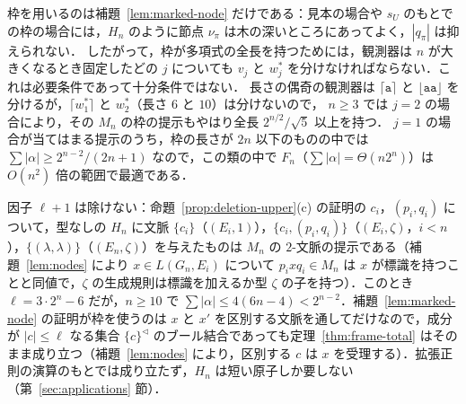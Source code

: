 \documentclass[11pt,a4paper]{ltjsarticle}
\numberwithin{equation}{section}
\theoremstyle{plain}
\theoremstyle{definition}
\theoremstyle{remark}
\theoremstyle{plain}
\newcommand{\eps}{\lambda}
\newcommand{\Lc}{^{\lhd}}
\newcommand{\Lfl}{\lfloor}
\newcommand{\Rfl}{\rfloor}
\newcommand{\Lce}{\lceil}
\newcommand{\Rce}{\rceil}
\newcommand{\ta}{\mathtt a}
\begin{document}
枠を用いるのは補題~\ref{lem:marked-node} だけである：見本の場合や $s_U$ のもとでの枠の場合には，$H_n$ のように節点 $\nu_\pi$ は木の深いところにあってよく，$|q_\pi|$ は抑えられない．
したがって，枠が多項式の全長を持つためには，観測器は $n$ が大きくなるとき固定したどの $j$ についても $v_j$ と $w^*_j$ を分けなければならない．これは必要条件であって十分条件ではない．
長さの偶奇の観測器は $\Lce\ta\Rce$ と $\Lfl\ta\ta\Rfl$ を分けるが，$\Lce w^*_1\Rce$ と $w^*_2$（長さ $6$ と $10$）は分けないので，
$n\ge3$ では $j=2$ の場合により，その $M_n$ の枠の提示もやはり全長 $2^{n/2}/\sqrt5$ 以上を持つ．
$j=1$ の場合が当てはまる提示のうち，枠の長さが $2n$ 以下のものの中では $\sum|\alpha|\ge2^{n-2}/(2n+1)$ なので，この類の中で $F_n$（$\sum|\alpha|=\Theta(n2^n)$）は $O(n^2)$ 倍の範囲で最適である．

因子 $\ell+1$ は除けない：命題~\ref{prop:deletion-upper}(c) の証明の $c_i$，$(p_i,q_i)$ について，型なしの $H_n$ に文脈 $\{c_i\}$（$(E_i,1)$），$\{c_i,(p_i,q_i)\}$（$(E_i,\zeta)$，$i<n$），$\{(\eps,\eps)\}$（$(E_n,\zeta)$）を与えたものは $M_n$ の $2$-文脈の提示である（補題~\ref{lem:nodes} により $x\in L(G_n,E_i)$ について $p_ixq_i\in M_n$ は $x$ が標識を持つことと同値で，$\zeta$ の生成規則は標識を加えるか型 $\zeta$ の子を持つ）．このとき $\ell=3\cdot2^n-6$ だが，$n\ge10$ で $\sum|\alpha|\le4(6n-4)<2^{n-2}$．補題~\ref{lem:marked-node} の証明が枠を使うのは $x$ と $x'$ を区別する文脈を通してだけなので，成分が $|c|\le\ell$ なる集合 $\{c\}\Lc$ のブール結合であっても定理~\ref{thm:frame-total} はそのまま成り立つ（補題~\ref{lem:nodes} により，区別する $c$ は $x$ を受理する）．拡張正則の演算のもとでは成り立たず，$H_n$ は短い原子しか要しない（第~\ref{sec:applications} 節）．
\end{document}
